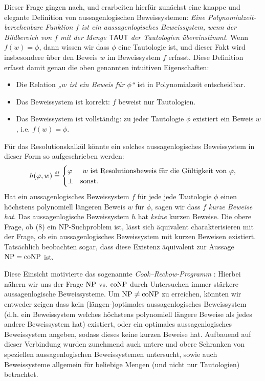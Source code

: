 Dieser Frage gingen \textcite{cook_relative_1979} nach, und erarbeiten hierfür zunächst eine knappe und elegante Definition von aussagenlogischen Beweissystemen: \emph{Eine Polynomialzeit-berechenbare Funktion $f$ ist ein \emph{aussagenlogisches Beweissystem}, wenn der Bildbereich von $f$ mit der Menge $\mathsf{TAUT}$ der Tautologien übereinstimmt}. Wenn $f(w)=\phi$, dann wissen wir dass $\phi$ eine Tautologie ist, und dieser Fakt wird insbesondere über den Beweis $w$ im Beweissystem $f$ erfasst. 
Diese Definition erfasst damit genau die oben genannten intuitiven Eigenschaften:
\begin{itemize}[noitemsep]
    \item Die Relation \emph{„$w$ ist ein Beweis für $\phi$“} ist in Polynomialzeit entscheidbar.
    \item Das Beweissystem ist korrekt: $f$ beweist nur Tautologien.
    \item Das Beweissystem ist vollständig: zu jeder Tautologie $\phi$ existiert ein Beweis $w$, i.e. $f(w)=\phi$.
\end{itemize}
Für das Resolutionskalkül könnte ein solches aussagenlogisches Beweissystem in dieser Form so aufgeschrieben werden:
\[ h(\varphi, w) \stackrel{\text{\smash{\tiny df}}}{=} \begin{cases} \varphi & \text{ $w$ ist Resolutionsbeweis für die Gültigkeit von $\varphi$},\\ \bot & \text{sonst}. \end{cases} \]
Hat ein aussagenlogisches Beweissystem $f$ für jede jede Tautologie $\phi$ einen höchstens polynomiell längeren Beweis $w$ für $\phi$, sagen wir dass $f$ \emph{kurze Beweise hat}. Das aussagenlogische Beweissystem $h$ hat \emph{keine} kurzen Beweise.
Die obere Frage, ob (8) ein NP-Suchproblem ist, lässt sich äquivalent charakterisieren mit der Frage, ob ein aussagenlogisches Beweissystem mit kurzen Beweisen existiert.
Tatsächlich beobachten \citeauthor{cook_relative_1979} sogar, dass diese Existenz äquivalent zur Aussage $\mathrm{NP}=\mathrm{coNP}$ ist.

Diese Einsicht motivierte das sogenannte \emph{Cook--Reckow-Programm} \parencite{buss_lectures_1996}: Hierbei nähern wir uns der Frage $\mathrm{NP}$ vs. $\mathrm{coNP}$ durch Untersuchen immer stärkere aussagenlogische Beweissysteme.
Um $\mathrm{NP}\neq\mathrm{coNP}$ zu erreichen, könnten wir entweder zeigen dass kein (längen-)optimales aussagenlogisches Beweissystem (d.h. ein Beweissystem welches höchstens polynomiell längere Beweise als jedes andere Beweissystem hat) existiert, oder ein optimales aussagenlogisches Beweissystem angeben, sodass dieses keine kurzen Beweise hat.
Aufbauend auf dieser Verbindung wurden zunehmend auch untere und obere Schranken von speziellen aussagenlogischen Beweissystemen untersucht, sowie auch Beweissysteme allgemein für beliebige Mengen (und nicht nur Tautologien) betrachtet.

